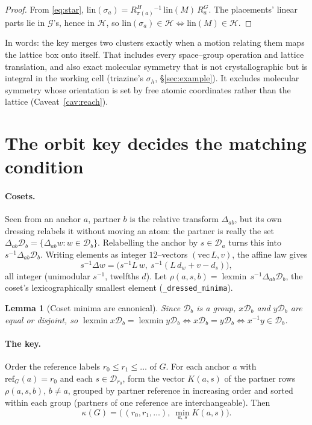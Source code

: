 \documentclass[11pt]{article}
\newtheorem{lemma}[theorem]{Lemma}
\theoremstyle{definition}
\newcommand{\Grp}{\mathcal{G}}
\newcommand{\Hgrp}{\mathcal{H}}
\newcommand{\Dgrp}{\mathcal{D}}
\newcommand{\inv}{^{-1}}
\newcommand{\lexmin}{\operatorname{lexmin}}
\newcommand{\key}{\kappa}
\begin{document}
\begin{proof}
From \eqref{eq:star}, $\mathrm{lin}(\sigma_a)=R^H_{\pi(a)}{}\inv\,\mathrm{lin}(M)\,R^G_a$.
The placements' linear parts lie in $\Grp$'s, hence in $\Hgrp$, so
$\mathrm{lin}(\sigma_a)\in\Hgrp\iff\mathrm{lin}(M)\in\Hgrp$.
\end{proof}

In words: the key merges two clusters exactly when a motion relating them maps
the lattice box onto itself. That includes every space--group operation and
lattice translation, and also exact molecular symmetry that is not
crystallographic but is integral in the working cell (triazine's $\sigma_h$,
\S\ref{sec:example}). It excludes molecular symmetry whose orientation is set by
free atomic coordinates rather than the lattice (Caveat~\ref{cav:reach}).

\section{The orbit key decides the matching condition}\label{sec:key}

\paragraph{Cosets.} Seen from an anchor $a$, partner $b$ is the relative
transform $\Delta_{ab}$, but its own dressing relabels it without moving an atom:
the partner is really the set $\Delta_{ab}\Dgrp_b=\{\Delta_{ab}w:w\in\Dgrp_b\}$.
Relabelling the anchor by $s\in\Dgrp_a$ turns this into
$s\inv\Delta_{ab}\Dgrp_b$. Writing elements as integer $12$--vectors
$(\mathrm{vec}\,L,v)$, the affine law gives
\begin{equation}\label{eq:row}
  s\inv\Delta w=\bigl(s\inv L\,w,\ s\inv(L\,d_w+v-d_s)\bigr),
\end{equation}
all integer (unimodular $s\inv$, twelfths $d$). Let
$\rho(a,s,b)=\lexmin\,s\inv\Delta_{ab}\Dgrp_b$, the coset's lexicographically
smallest element (\texttt{\_dressed\_minima}).

\begin{lemma}[Coset minima are canonical]\label{lem:coset}
Since $\Dgrp_b$ is a group, $x\Dgrp_b$ and $y\Dgrp_b$ are equal or disjoint, so
$\lexmin x\Dgrp_b=\lexmin y\Dgrp_b\iff x\Dgrp_b=y\Dgrp_b\iff x\inv y\in\Dgrp_b$.
\end{lemma}

\paragraph{The key.} Order the reference labels
$r_0\le r_1\le\dots$ of $G$. For each anchor $a$ with
$\mathrm{ref}_G(a)=r_0$ and each $s\in\Dgrp_{r_0}$, form the vector
$K(a,s)$ of the partner rows $\rho(a,s,b)$, $b\ne a$, grouped by partner reference
in increasing order and sorted within each group (partners of one reference are
interchangeable). Then
\begin{equation}\label{eq:key}
  \key(G)=\bigl(\,(r_0,r_1,\dots),\ \min_{a,\,s}K(a,s)\bigr).
\end{equation}
\end{document}
